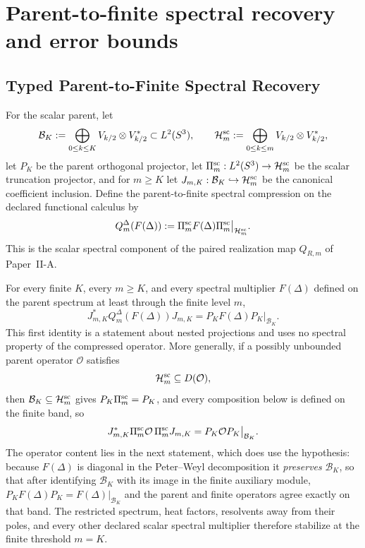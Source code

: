 \documentclass[12pt,a4paper]{article}
\begin{document}
\section{Parent-to-finite spectral recovery and error bounds}
\label{paper2d:sec:organized-recovery}

\subsection{Typed Parent-to-Finite Spectral Recovery}
\label{p2d:sec:typed-parent-finite-recovery}

For the scalar parent, let
\[
 \mathcal B_K
 :=\bigoplus_{0\le k\le K}V_{k/2}\otimes V_{k/2}^{*}
 \subset L^2(S^3),
 \qquad
 \mathcal H_m^{\rm sc}
 :=\bigoplus_{0\le k\le m}V_{k/2}\otimes V_{k/2}^{*},
\]
let \(P_K\) be the parent orthogonal projector, let
\(\Pi_m^{\rm sc}:L^2(S^3)\to\mathcal H_m^{\rm sc}\) be the scalar truncation
projector, and for \(m\ge K\) let
\(J_{m,K}:\mathcal B_K\hookrightarrow\mathcal H_m^{\rm sc}\) be the canonical
coefficient inclusion.  Define the parent-to-finite spectral compression on
the declared functional calculus by
\[
 Q_m^\Delta(F(\Delta))
 :=\Pi_m^{\rm sc}F(\Delta)\Pi_m^{\rm sc}
    \big|_{\mathcal H_m^{\rm sc}}.
\]
This is the scalar spectral component of the paired realization map
\(Q_{R,m}\) of Paper~II-A.

\begin{theorem}
\label{p2d:thm:scalar-fixed-band-recovery}
For every finite \(K\), every \(m\ge K\), and every spectral multiplier
\(F(\Delta)\) defined on the parent spectrum at least through the finite level
\(m\),
\[
 J_{m,K}^{*}Q_m^\Delta(F(\Delta))J_{m,K}
 =P_KF(\Delta)P_K\big|_{\mathcal B_K}.
\]
This first identity is a statement about nested projections and uses no
spectral property of the compressed operator.  More generally, if a possibly
unbounded parent operator \(\mathcal O\) satisfies
\[
       \mathcal H_m^{\rm sc}\subseteq D(\mathcal O),
\]
then \(\mathcal B_K\subseteq\mathcal H^{\rm sc}_m\) gives
\(P_K\Pi^{\rm sc}_m=P_K\), and every composition below is defined on the
finite band, so
\[
 J^{*}_{m,K}\Pi^{\rm sc}_m\mathcal O\,\Pi^{\rm sc}_mJ_{m,K}
 =P_K\mathcal OP_K\big|_{\mathcal B_K}.
\]
The operator content lies in the next statement, which does use the hypothesis:
because \(F(\Delta)\) is diagonal in the Peter--Weyl decomposition it
\emph{preserves} \(\mathcal B_K\), so that after identifying \(\mathcal B_K\) with
its image in the finite auxiliary module, \(P_KF(\Delta)P_K=F(\Delta)\big|_{\mathcal B_K}\)
and the parent and finite operators agree exactly on that band.  The
restricted spectrum, heat factors, resolvents away from their poles, and every
other declared scalar spectral multiplier therefore stabilize at the finite
threshold \(m=K\).
\end{theorem}
\end{document}
